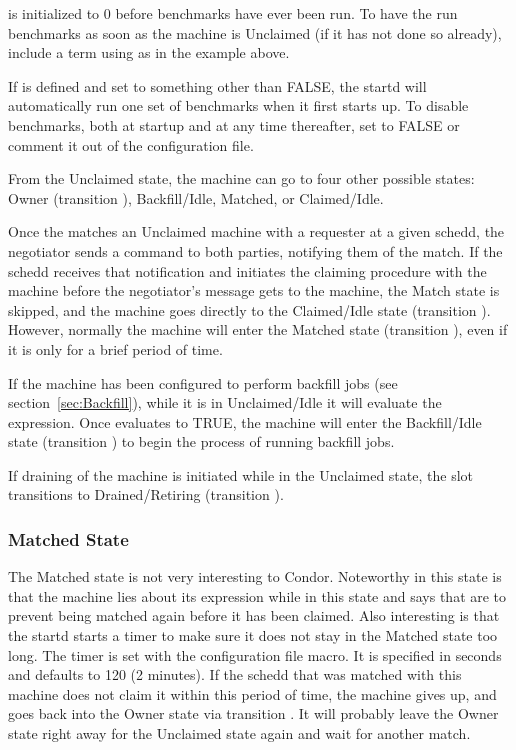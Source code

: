\Note {} is initialized to 0 before benchmarks
have ever been run.
To have the  run benchmarks as soon as the machine is
Unclaimed (if it has not done so already),
include a term using  as in the example above.

\Note If  is defined and set to something
other than FALSE, the startd will automatically run one set of
benchmarks when it first starts up.
To disable benchmarks, both at startup and at any time thereafter,
set  to FALSE or comment it out of the
configuration file.

From the Unclaimed state, the machine can go to four other possible
states: Owner (transition ), Backfill/Idle, Matched, or
Claimed/Idle.

Once the  matches an Unclaimed machine with a
requester at a given schedd, the negotiator sends a command to both
parties, notifying them of the match.  
If the schedd receives that notification and initiates the claiming
procedure with the machine before the negotiator's message gets to the
machine, the Match state is skipped,
and the machine goes
directly to the Claimed/Idle state (transition ).
However, normally the machine will enter the Matched state (transition
), even if it is only for a brief period of time.

If the machine has been configured to perform backfill jobs (see
section~\ref{sec:Backfill}), while it is in Unclaimed/Idle it will
evaluate the  expression.
Once  evaluates to TRUE, the machine will enter
the Backfill/Idle state (transition ) to begin the process of
running backfill jobs.

If draining of the machine is initiated while in the Unclaimed state,
the slot transitions to Drained/Retiring (transition ).

\subsubsection{\label{sec:Matched-State}Matched State}

The Matched state is not very interesting to Condor.
Noteworthy in this state is that the machine lies about its 
expression while in this state and says that  are
 to prevent being matched again before it has been claimed.
Also interesting is that
the startd starts a timer to make sure it does not stay in the
Matched state too long.
The timer is set with the 
\label{param:MatchTimeout} configuration file macro.
It is specified in seconds and defaults to 120 (2 minutes).
If the schedd that was matched with this machine does not
claim it within this period of time, the machine gives up,
and goes back into the Owner state via transition .
It will probably leave the Owner state right away for the
Unclaimed state again and wait for another match. 

